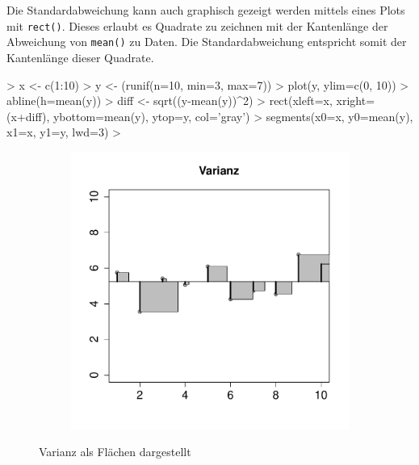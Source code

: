 \noindent
Die Standardabweichung kann auch graphisch gezeigt werden mittels
eines Plots mit \lstinline{rect()}. Dieses erlaubt es Quadrate zu
zeichnen mit der Kantenlänge der Abweichung von \lstinline{mean()}
zu Daten. Die Standardabweichung entspricht somit der Kantenlänge
dieser Quadrate.

\begin{Schunk}
\begin{Sinput}
> x <- c(1:10)
> y <- (runif(n=10, min=3, max=7))
> plot(y, ylim=c(0, 10))
> abline(h=mean(y))
> diff <- sqrt((y-mean(y))^2) 
> rect(xleft=x, xright=(x+diff), ybottom=mean(y), ytop=y, col='gray')
> segments(x0=x, y0=mean(y), x1=x, y1=y, lwd=3)
> 
\end{Sinput}
\end{Schunk}


\begin{figure}[h!]
\centering
\begin{subfigure}[b]{0.48\textwidth}
\includegraphics{begriffe-006}
\end{subfigure}
\caption{Varianz als Flächen dargestellt}
\end{figure}

